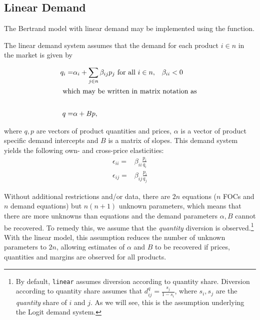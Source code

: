\documentclass[11pt,numbers=noenddot,pointlessnumbers]{scrreprt}
\numberwithin{equation}{section}
\begin{document}
\subsection{Linear Demand}
The Bertrand model with linear demand  may be implemented using the
\verb@linear@ function.

The linear demand system assumes that the demand for each product $i
\in n$
in the market is given by

\begin{align*}
  q_i=& \alpha_i + \sum_{j\in n}\beta_{ij} p_j \mbox{ for all $i\in
    n$},& \beta_{ii}<0\\
  \intertext{ which may be written in matrix notation as }\\
  q=&\alpha + Bp,&
\end{align*}

where $q,p$ are vectors of product quantities and prices, $\alpha$ is a vector of product specific demand intercepts and
$B$ is a matrix of slopes. This demand system yields the following
own- and cross-price elasticities:
\begin{align*}
  \epsilon_{ii}=&\beta_{ii}\frac{p_i}{q_i} \\
  \epsilon_{ij}=&\beta_{ij}\frac{p_i}{q_j}
\end{align*}


Without additional restrictions and/or data, there are $2n$ equations
($n$ FOCs and $n$ demand equations)
but $n(n+1)$ unknown parameters, which means that there are more
unknowns than equations and the demand parameters
$\alpha,B$ cannot be recovered. To remedy this, we assume that the
\emph{quantity} diversion is observed.\footnote{By default,
    \texttt{linear} assumes diversion according to quantity
    share. Diversion according to quantity share assumes that
  $d^q_{ij}=\frac{s_j}{1-s_i}$, where $s_i,s_j$ are the
  \emph{quantity} share of $i$ and $j$. As we will see, this is the assumption underlying the
  Logit demand system. } With the linear model, this assumption reduces the number of
unknown parameters to $2n$, allowing estimates of $\alpha$ and
$B$ to be recovered if prices, quantities and margins are observed for
all products.
\end{document}
